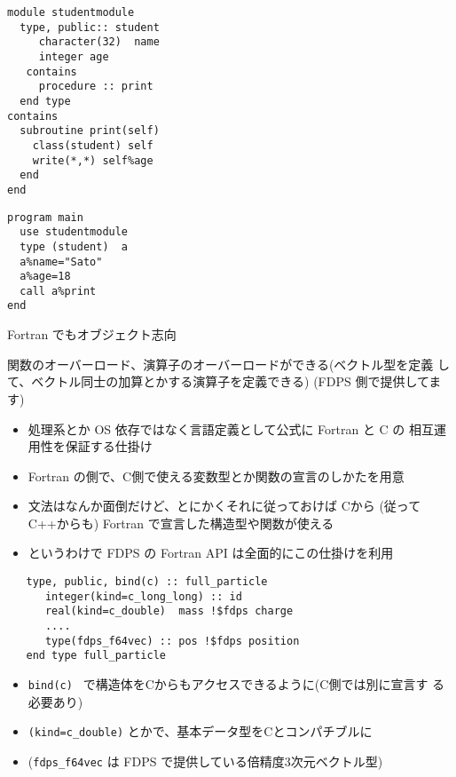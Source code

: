\documentclass[12pt,dvipdfmx]{article}
\begin{document}
\begin{minipage}[t]{7cm}
\begin{verbatim}
module studentmodule
  type, public:: student
     character(32)  name
     integer age
   contains
     procedure :: print
  end type
contains
  subroutine print(self)
    class(student) self
    write(*,*) self%age
  end
end

\end{verbatim}
\end{minipage}
\begin{minipage}[t]{7cm}
\begin{verbatim}
program main
  use studentmodule
  type (student)  a
  a%name="Sato"
  a%age=18
  call a%print
end
\end{verbatim}


Fortran でもオブジェクト志向

\medskip


関数のオーバーロード、演算子のオーバーロードができる(ベクトル型を定義
して、ベクトル同士の加算とかする演算子を定義できる)
(FDPS 側で提供してます)



\end{minipage}


\begin{itemize}

\item 処理系とか OS 依存ではなく言語定義として公式に Fortran と C の
相互運用性を保証する仕掛け

\item Fortran の側で、C側で使える変数型とか関数の宣言のしかたを用意

\item 文法はなんか面倒だけど、とにかくそれに従っておけば Cから (従って
C++からも) Fortran で宣言した構造型や関数が使える

\item というわけで FDPS の Fortran API は全面的にこの仕掛けを利用


\end{itemize}

\begin{verbatim}
   type, public, bind(c) :: full_particle
      integer(kind=c_long_long) :: id
      real(kind=c_double)  mass !$fdps charge
      ....
      type(fdps_f64vec) :: pos !$fdps position
   end type full_particle
\end{verbatim}
\begin{itemize}
\item {\tt bind(c) } で構造体をCからもアクセスできるように(C側では別に宣言す
る必要あり)
\item {\tt (kind=c\_double)} とかで、基本データ型をCとコンパチブルに
\item ({\tt fdps\_f64vec} は FDPS で提供している倍精度3次元ベクトル型)
\end{itemize}
\end{document}
